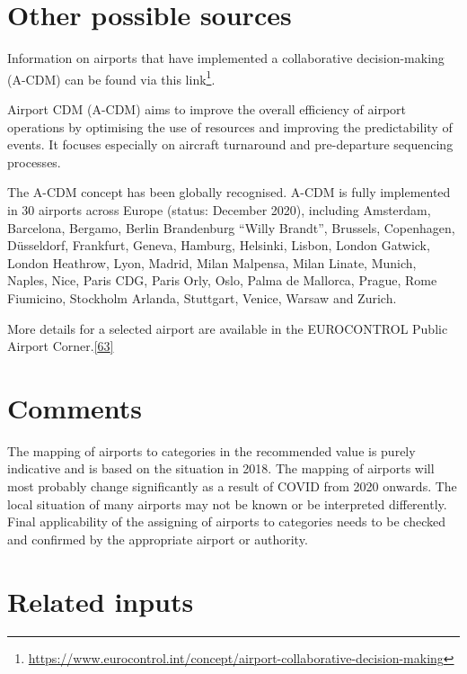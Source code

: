 \documentclass[
  11pt,
  a4paper,
]{book}
\DeclareRobustCommand{\href}[2]{#2\footnote{\url{#1}}}
\begin{document}
\hypertarget{other-possible-sources-5}{%
\section{Other possible sources}\label{other-possible-sources-5}}

Information on airports that have implemented a collaborative
decision-making (A-CDM) can be found
\href{https://www.eurocontrol.int/concept/airport-collaborative-decision-making}{via
this link}.

Airport CDM (A-CDM) aims to improve the overall efficiency of airport
operations by optimising the use of resources and improving the
predictability of events. It focuses especially on aircraft turnaround
and pre-departure sequencing processes.

The A-CDM concept has been globally recognised. A-CDM is fully
implemented in 30 airports across Europe (status: December 2020),
including Amsterdam, Barcelona, Bergamo, Berlin Brandenburg ``Willy
Brandt'', Brussels, Copenhagen, Düsseldorf, Frankfurt, Geneva, Hamburg,
Helsinki, Lisbon, London Gatwick, London Heathrow, Lyon, Madrid, Milan
Malpensa, Milan Linate, Munich, Naples, Nice, Paris CDG, Paris Orly,
Oslo, Palma de Mallorca, Prague, Rome Fiumicino, Stockholm Arlanda,
Stuttgart, Venice, Warsaw and Zurich.

More details for a selected airport are available in the EUROCONTROL
Public Airport Corner.\protect\hyperlink{ref-apt:corner}{{[}63{]}}

\hypertarget{comments-12}{%
\section{Comments}\label{comments-12}}

The mapping of airports to categories in the recommended value is purely
indicative and is based on the situation in 2018. The mapping of
airports will most probably change significantly as a result of COVID
from 2020 onwards. The local situation of many airports may not be known
or be interpreted differently. Final applicability of the assigning of
airports to categories needs to be checked and confirmed by the
appropriate airport or authority.

\hypertarget{related-inputs-25}{%
\section{Related inputs}\label{related-inputs-25}}
\end{document}
